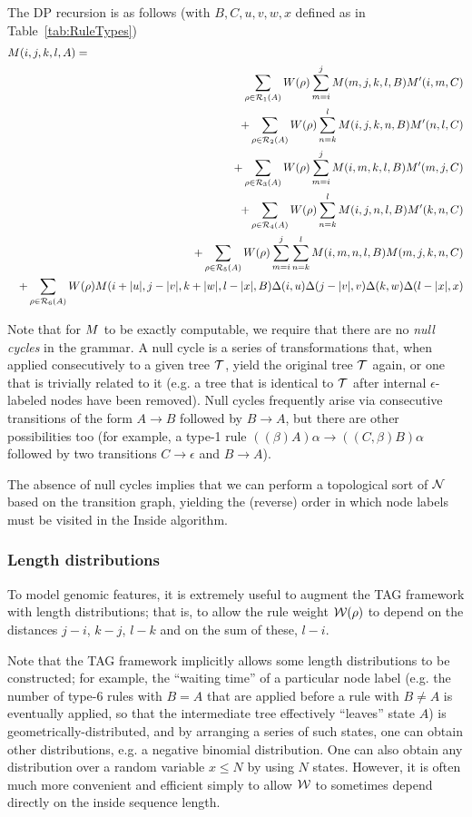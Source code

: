 \documentclass[10pt]{article}
\newcommand{\tabnum}[1]{\ref{tab:#1}}
\newcommand{\tabref}[1]{Table~\tabnum{#1}}
\begin{document}
The DP recursion is as follows (with $B,C,u,v,w,x$ defined as in \tabref{RuleTypes})
\begin{eqnarray*}
\lefteqn{\m(i,j,k,l,A) =} \\
& &
\sum_{\rho \in \rulesubset{1}{A}} W(\rho) \sum_{m=i}^j \m(m,j,k,l,B) \mtip(i,m,C) \\
& & +
\sum_{\rho \in \rulesubset{2}{A}} W(\rho) \sum_{n=k}^l \m(i,j,k,n,B) \mtip(n,l,C) \\
& & +
\sum_{\rho \in \rulesubset{3}{A}} W(\rho) \sum_{m=i}^j \m(i,m,k,l,B) \mtip(m,j,C) \\
& & +
\sum_{\rho \in \rulesubset{4}{A}} W(\rho) \sum_{n=k}^l \m(i,j,n,l,B) \mtip(k,n,C) \\
& & +
\sum_{\rho \in \rulesubset{5}{A}} W(\rho) \sum_{m=i}^j \sum_{n=k}^l \m(i,m,n,l,B) \m(m,j,k,n,C) \\
& & +
\sum_{\rho \in \rulesubset{6}{A}} W(\rho) \m(i+|u|,j-|v|,k+|w|,l-|x|,B)
 \Delta(i,u) \Delta(j-|v|,v) \Delta(k,w) \Delta(l-|x|,x)
\end{eqnarray*}

Note that for $M$ to be exactly computable, we require that there are no {\em null cycles} in the grammar.
A null cycle is a series of transformations that, when applied consecutively to a given tree ${\cal T}$, yield the original tree ${\cal T}$ again,
or one that is trivially related to it (e.g. a tree that is identical to ${\cal T}$ after internal $\epsilon$-labeled nodes have been removed).
Null cycles frequently arise via consecutive transitions of the form $A \to B$ followed by $B \to A$,
but there are other possibilities too (for example, a type-1 rule $((\beta)A)\alpha \to ((C,\beta)B)\alpha$
followed by two transitions $C \to \epsilon$ and $B \to A$).

The absence of null cycles implies that we can perform a topological sort of ${\cal N}$ based on the transition graph,
yielding the (reverse) order in which node labels must be visited in the Inside algorithm.

\subsubsection{Length distributions}

To model genomic features, it is extremely useful to augment the TAG framework with length distributions;
that is, to allow the rule weight ${\cal W}(\rho)$ to depend on the distances $j-i$, $k-j$, $l-k$ and on the sum of these, $l-i$.

Note that the TAG framework implicitly allows some length distributions to be constructed;
for example, the ``waiting time'' of a particular node label
(e.g. the number of type-6 rules with $B=A$ that are applied before a rule with $B \neq A$ is eventually applied,
so that the intermediate tree effectively ``leaves'' state $A$) is geometrically-distributed, and by arranging a series of such states,
one can obtain other distributions, e.g. a negative binomial distribution.
One can also obtain any distribution over a random variable $x \leq N$ by using $N$ states.
However, it is often much more convenient and efficient simply to allow ${\cal W}$ to sometimes depend directly on the inside sequence length.
\end{document}
